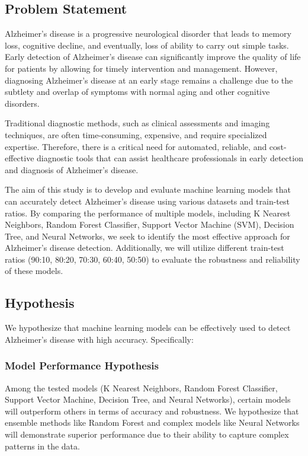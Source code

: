 \documentclass[a4paper,12pt]{report}
\begin{document}
\subsection{Problem Statement}
Alzheimer's disease is a progressive neurological disorder that leads to memory loss, cognitive decline, and eventually, loss of ability to carry out simple tasks. Early detection of Alzheimer's disease can significantly improve the quality of life for patients by allowing for timely intervention and management. However, diagnosing Alzheimer's disease at an early stage remains a challenge due to the subtlety and overlap of symptoms with normal aging and other cognitive disorders.

Traditional diagnostic methods, such as clinical assessments and imaging techniques, are often time-consuming, expensive, and require specialized expertise. Therefore, there is a critical need for automated, reliable, and cost-effective diagnostic tools that can assist healthcare professionals in early detection and diagnosis of Alzheimer's disease.

The aim of this study is to develop and evaluate machine learning models that can accurately detect Alzheimer's disease using various datasets and train-test ratios. By comparing the performance of multiple models, including K Nearest Neighbors, Random Forest Classifier, Support Vector Machine (SVM), Decision Tree, and Neural Networks, we seek to identify the most effective approach for Alzheimer's disease detection. Additionally, we will utilize different train-test ratios (90:10, 80:20, 70:30, 60:40, 50:50) to evaluate the robustness and reliability of these models.

\subsection{Hypothesis}
We hypothesize that machine learning models can be effectively used to detect Alzheimer's disease with high accuracy. Specifically:

\subsubsection{Model Performance Hypothesis}
Among the tested models (K Nearest Neighbors, Random Forest Classifier, Support Vector Machine, Decision Tree, and Neural Networks), certain models will outperform others in terms of accuracy and robustness. We hypothesize that ensemble methods like Random Forest and complex models like Neural Networks will demonstrate superior performance due to their ability to capture complex patterns in the data.
\end{document}
